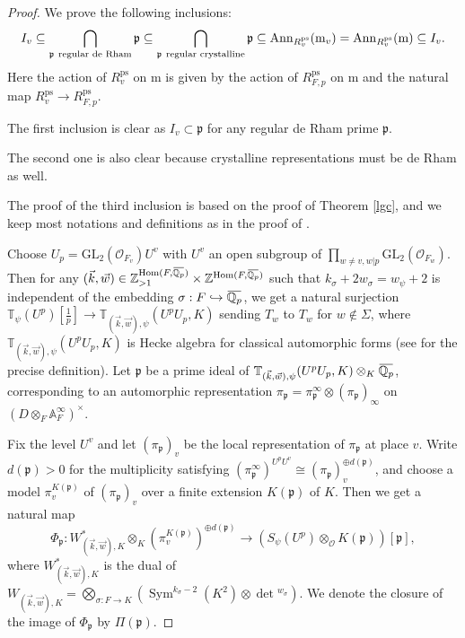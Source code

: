 \documentclass[a4paper, 12pt]{amsart}
\DeclareMathOperator{\Hom}{Hom}
\DeclareMathOperator{\Sym}{Sym}
\def\ps{\mathrm{ps}}
\newcommand{\Z}{\mathbb{Z}}
\newcommand{\Q}{\mathbb{Q}}
\newcommand{\T}{\mathbb{T}}
\newcommand{\A}{\mathbb{A}}
\newcommand{\GL}{\mathrm{GL}}
\newcommand{\cO}{\mathcal{O}}
\newcommand{\kp}{\mathfrak{p}}
\newcommand{\mm}{\mathrm{m}}
\newcommand{\DAi}{(D\otimes_F \A_F^\infty)^\times}
\newcommand{\overbar}[1]{\mkern 1.5mu\overline{\mkern-1.5mu#1\mkern-1.5mu}\mkern 1.5mu}
\begin{document}
    \begin{proof}
    	We prove the following inclusions:
    	$$
    	I_v \subseteq \bigcap_{\kp~\textnormal{regular de Rham}} \kp \subseteq \bigcap_{\kp~\textnormal{regular crystalline}} \kp \subseteq \operatorname{Ann}_{R_v^\ps}(\mm_v) = \operatorname{Ann}_{R_v^\ps} (\mm) \subseteq I_v .$$
    	Here the action of $ R_v^\ps$ on $ \mm$ is given by the action of  $R_{F,p}^\ps$ on $ \mm$ and the natural map $R_v^\ps \to R_{F,p}^\ps $.
    	
    	
    	The first inclusion is clear as $I_v \subset \kp$ for any regular de Rham prime $\kp$.
    	
    	The second one is also clear because crystalline representations must be de Rham as well.
    	
    	The proof of the third inclusion is based on the proof of Theorem \ref{lgc}, and we keep most notations and definitions as in the proof of \cite[Theorem 3.3.3]{Zhang:2024aa}. 
    	
    	Choose $U_p = \GL_2(\cO_{F_v})U^v$ with $U^v$ an open subgroup of  $\prod_{w\neq v, w|p}\GL_2(\cO_{F_w})$. Then for any $(\vec{k},\vec{w})\in \Z_{>1}^{\Hom(F,\overbar{\Q_p})}\times  \Z^{\Hom(F,\overbar{\Q_p})}$ such that $k_\sigma+2w_\sigma=w_\psi+2$ is independent of the embedding $\sigma: F \hookrightarrow \overbar{\Q_p}$, we get a natural surjection $\T_\psi(U^p)[\frac{1}{p}]\to\T_{(\vec{k},\vec{w}),\psi}(U^pU_p,K)$ sending $T_w$ to $T_w$ for $w\notin \Sigma$, where $ \T_{(\vec{k},\vec{w}),\psi}(U^pU_p,K)$ is Hecke algebra for classical automorphic forms (see \cite[3.3.2]{pan2022fontaine} for the precise definition). Let $\kp$ be a prime ideal of $\T_{(\vec{k},\vec{w}),\psi}(U^pU_p,K)\otimes_K\overbar{\Q_p}$, corresponding to an automorphic representation $\pi_\kp=\pi_\kp^\infty\otimes(\pi_\kp)_\infty$ on $\DAi$.
    	
    	Fix the level $U^v$ and let $(\pi_\kp)_v$ be the local representation of $\pi_\kp$ at place $v$. Write $d(\kp)>0$ for the multiplicity satisfying $(\pi_\kp^\infty)^{U^pU^v}\cong (\pi_\kp)_v^{\oplus d(\kp)} $, and choose a model $\pi^{K(\kp)}_v$ of $(\pi_\kp)_v$ over a finite extension $K(\kp) $ of $K$. Then we get a natural map
    	\[\Phi_{\kp}:W^{*}_{(\vec{k},\vec{w}),K}\otimes_K (\pi^{K(\kp)}_v)^{\oplus d(\kp)}\to (S_\psi(U^p)\otimes_{\cO} K(\kp))[\kp],\]
    	where $W^{*}_{(\vec{k},\vec{w}),K}$ is the dual of $W_{(\vec{k},\vec{w}),K}=\bigotimes_{\sigma:F\to K}(\Sym^{k_\sigma-2}(K^2)\otimes \det{}^{w_\sigma})$. We denote the closure of the image of $\Phi_{\kp} $ by $\Pi(\kp)$. 
    	

\end{proof}
\end{document}
